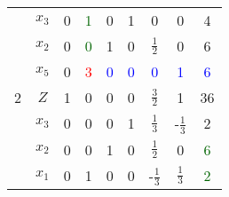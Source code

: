 \documentclass{article}
\begin{document}
\begin{table}[h]
\begin{tabular}{|c|c|c|c|c|c|c|c|c|}
                                 & $x_3$                        & 0                                          & \textcolor{darkgreen}{1} & 0                        & 1                   & 0                   & 0                   & 4                        \\
                                 & $x_2$                        & 0                                          & \textcolor{darkgreen}{0} & 1                        & 0                   & $\frac{1}{2}$       & 0                   & 6                        \\
                                 & $x_5$                        & 0                                          & \textcolor{red}{3}       & \textcolor{blue}{0}      & \textcolor{blue}{0} & \textcolor{blue}{0} & \textcolor{blue}{1} & \textcolor{blue}{6}      \\
    \hline
    2                            & $Z$                          & 1                                          & 0                        & 0                        & 0                   & $\frac{3}{2}$       & 1                   & 36                       \\
                                 & $x_3$                        & 0                                          & 0                        & 0                        & 1                   & $\frac{1}{3}$       & -$\frac{1}{3}$      & 2                        \\
                                 & $x_2$                        & 0                                          & 0                        & 1                        & 0                   & $\frac{1}{2}$       & 0                   & \textcolor{darkgreen}{6} \\
                                 & $x_1$                        & 0                                          & 1                        & 0                        & 0                   & -$\frac{1}{3}$      & $\frac{1}{3}$       & \textcolor{darkgreen}{2} \\
    \hline
  \end{tabular}
\end{table}
\end{document}
